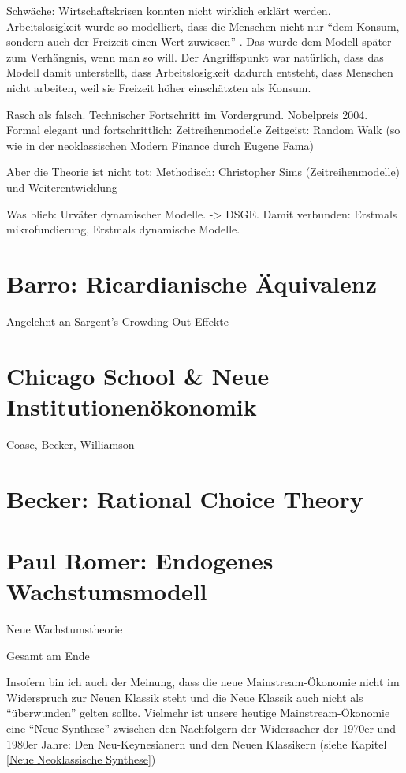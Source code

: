 Schwäche: Wirtschaftskrisen konnten nicht wirklich erklärt werden. Arbeitslosigkeit wurde so modelliert, dass die Menschen nicht nur "`dem Konsum, sondern auch der Freizeit einen Wert zuwiesen"' \parencite[S. 1345]{Kydland1982}. Das wurde dem Modell später zum Verhängnis, wenn man so will. Der Angriffspunkt war natürlich, dass das Modell damit unterstellt, dass Arbeitslosigkeit dadurch entsteht, dass Menschen nicht arbeiten, weil sie Freizeit höher einschätzten als Konsum.




Rasch als falsch. Technischer Fortschritt im Vordergrund. Nobelpreis 2004.
Formal elegant und fortschrittlich: Zeitreihenmodelle
Zeitgeist: Random Walk (so wie in der neoklassischen Modern Finance durch Eugene Fama)

Aber die Theorie ist nicht tot:
Methodisch: Christopher Sims (Zeitreihenmodelle) und Weiterentwicklung 

Was blieb: Urväter dynamischer Modelle. -> DSGE. Damit verbunden: Erstmals mikrofundierung, Erstmals dynamische Modelle. 


\section{Barro: Ricardianische Äquivalenz}
Angelehnt an Sargent's \cite{Sargent1975}
Crowding-Out-Effekte

\section{Chicago School \& Neue Institutionenökonomik}
Coase, Becker, Williamson 

\section{Becker: Rational Choice Theory}




\section{Paul Romer: Endogenes Wachstumsmodell} Neue Wachstumstheorie









Gesamt am Ende



Insofern bin ich auch der Meinung, dass die neue Mainstream-Ökonomie nicht im Widerspruch zur Neuen Klassik steht und die Neue Klassik auch nicht als "`überwunden"' gelten sollte. Vielmehr ist unsere heutige Mainstream-Ökonomie eine "`Neue Synthese"' zwischen den Nachfolgern der Widersacher der 1970er und 1980er Jahre: Den Neu-Keynesianern und den Neuen Klassikern (siehe Kapitel \ref{Neue Neoklassische Synthese})


